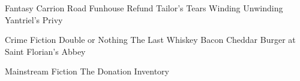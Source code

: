 
\begingroup

\def\genre#1{{\bigskip#1}}
\def\genrebook#1{{\smallskip#1}}

\parindent=0pt

\genre{Fantasy}
  \genrebook{Carrion Road}
  \genrebook{Funhouse}
  \genrebook{Refund}
  \genrebook{Tailor's Tears}
  \genrebook{Winding Unwinding}
  \genrebook{Yantriel's Privy}

\genre{Crime Fiction}
  \genrebook{Double or Nothing}
  \genrebook{The Last Whiskey Bacon Cheddar Burger at Saint Florian's Abbey}

\genre{Mainstream Fiction}
  \genrebook{The Donation}
  \genrebook{Inventory}

\endgroup
